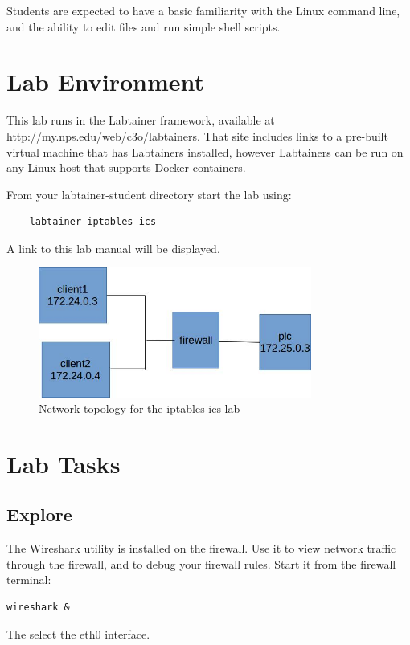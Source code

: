 Students are expected to have a basic 
familiarity with the Linux command line, and the ability to edit files and
run simple shell scripts.

\section{Lab Environment}
This lab runs in the Labtainer framework,
available at http://my.nps.edu/web/c3o/labtainers.
That site includes links to a pre-built virtual machine
that has Labtainers installed, however Labtainers can
be run on any Linux host that supports Docker containers.

From your labtainer-student directory start the lab using:
\begin{verbatim}
    labtainer iptables-ics
\end{verbatim}
\noindent A link to this lab manual will be displayed.  


\begin{figure}[htb]
\begin{center}
\includegraphics [width=0.8\textwidth,natwidth=621,natheight=403]{iptables-ics.jpg}
\end{center}
\caption{Network topology for the iptables-ics lab}
\label{fig:topology}
\end{figure}

\section{Lab Tasks}
\subsection{Explore}
The Wireshark utility is installed on the firewall. 
Use it to view network traffic through the firewall, and to 
debug your firewall rules.  Start it from the firewall terminal:
\begin{verbatim}
wireshark &
\end{verbatim}
\noindent The select the eth0 interface.

